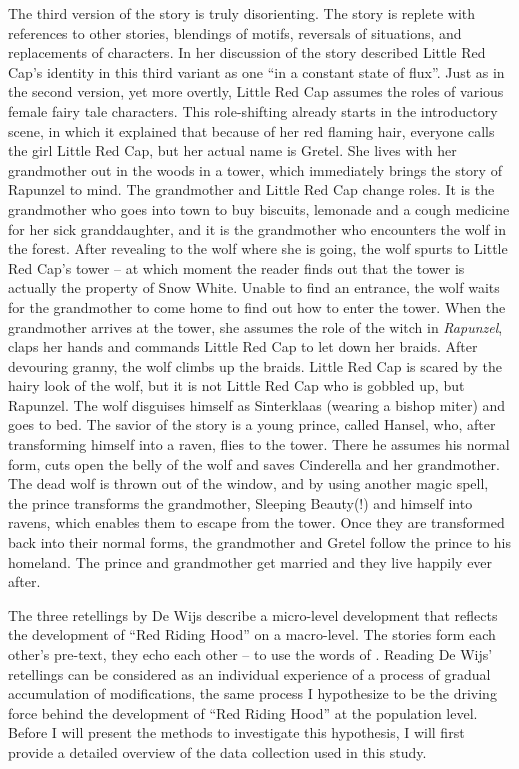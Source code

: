 The third version of the story is truly disorienting. The story is replete with references to other stories, blendings of motifs, reversals of situations, and replacements of characters. In her discussion of the story \citeauthor{beckett:2002} described Little Red Cap's identity in this third variant as one ``in a constant state of flux''\autocite[100]{beckett:2002}. Just as in the second version, yet more overtly, Little Red Cap assumes the roles of various female fairy tale characters. This role-shifting already starts in the introductory scene, in which it explained that because of her red flaming hair, everyone calls the girl Little Red Cap, but her actual name is Gretel. She lives with her grandmother out in the woods in a tower, which immediately brings the story of Rapunzel to mind. The grandmother and Little Red Cap change roles. It is the grandmother who goes into town to buy biscuits, lemonade and a cough medicine for her sick granddaughter, and it is the grandmother who encounters the wolf in the forest. After revealing to the wolf where she is going, the wolf spurts to Little Red Cap's tower -- at which moment the reader finds out that the tower is actually the property of Snow White. Unable to find an entrance, the wolf waits for the grandmother to come home to find out how to enter the tower. When the grandmother arrives at the tower, she assumes the role of the witch in \emph{Rapunzel}, claps her hands and commands Little Red Cap to let down her braids. After devouring granny, the wolf climbs up the braids. Little Red Cap is scared by the hairy look of the wolf, but it is not Little Red Cap who is gobbled up, but Rapunzel. The wolf disguises himself as Sinterklaas (wearing a bishop miter) and goes to bed. The savior of the story is a young prince, called Hansel, who, after transforming himself into a raven, flies to the tower. There he assumes his normal form, cuts open the belly of the wolf and saves Cinderella and her grandmother. The dead wolf is thrown out of the window, and by using another magic spell, the prince transforms the grandmother, Sleeping Beauty(!) and himself into ravens, which enables them to escape from the tower. Once they are transformed back into their normal forms, the grandmother and Gretel follow the prince to his homeland. The prince and grandmother get married and they live happily ever after.

The three retellings by De Wijs describe a micro-level development that reflects the development of ``Red Riding Hood'' on a macro-level. The stories form each other's pre-text, they echo each other -- to use the words of \citet[37]{frank:2010}. Reading De Wijs' retellings can be considered as an individual experience of a process of gradual accumulation of modifications, the same process I hypothesize to be the driving force behind the development of ``Red Riding Hood'' at the population level. Before I will present the methods to investigate this hypothesis, I will first provide a detailed overview of the data collection used in this study.

